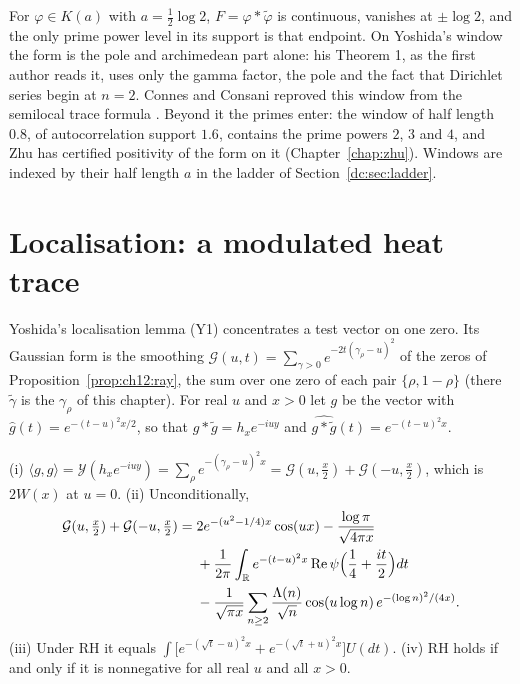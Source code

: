 For $\varphi\in K(a)$ with $a=\frac12\log2$, $F=\varphi*\widetilde\varphi$ is continuous, vanishes at $\pm\log2$, and the only prime power level in its support is that endpoint. On Yoshida's window the form is the pole and archimedean part alone: his Theorem 1, as the first author reads it, uses only the gamma factor, the pole and the fact that Dirichlet series begin at $n=2$. Connes and Consani reproved this window from the semilocal trace formula \cite{ConnesConsani21}. Beyond it the primes enter: the window of half length $0.8$, of autocorrelation support $1.6$, contains the prime powers $2$, $3$ and $4$, and Zhu \cite{Zhu26} has certified positivity of the form on it (Chapter~\ref{chap:zhu}). Windows are indexed by their half length $a$ in the ladder of Section~\ref{dc:sec:ladder}.

\section{Localisation: a modulated heat trace}\label{yo:sec:loc}

Yoshida's localisation lemma (Y1) concentrates a test vector on one zero. Its Gaussian form is the smoothing $\mathcal G(u,t)=\sum_{\gamma>0}e^{-2t(\gamma_\rho-u)^2}$ of the zeros of Proposition~\ref{prop:ch12:ray}, the sum over one zero of each pair $\{\rho,1-\rho\}$ (there $\widetilde\gamma$ is the $\gamma_\rho$ of this chapter). For real $u$ and $x>0$ let $g$ be the vector with $\widehat g(t)=e^{-(t-u)^2x/2}$, so that $g*\widetilde g=h_xe^{-iuy}$ and $\widehat{g*\widetilde g}(t)=e^{-(t-u)^2x}$.

\begin{proposition}\label{yo:prop:W}
(i) $\langle g,g\rangle=\mathcal Y(h_xe^{-iuy})=\sum_\rho e^{-(\gamma_\rho-u)^2x}=\mathcal G(u,\tfrac x2)+\mathcal G(-u,\tfrac x2)$, which is $2W(x)$ at $u=0$. (ii) Unconditionally,
\[
\begin{split}
\mathcal G(u,\tfrac x2)+\mathcal G(-u,\tfrac x2)={}&2e^{-(u^2-1/4)x}\cos(ux)-\frac{\log\pi}{\sqrt{4\pi x}}\\
&+\frac1{2\pi}\int_{\mathbb{R}} e^{-(t-u)^2x}\operatorname{Re}\psi\Bigl(\frac14+\frac{it}2\Bigr)dt\\
&-\frac1{\sqrt{\pi x}}\sum_{n\ge2}\frac{\Lambda(n)}{\sqrt n}\cos(u\log n)\,e^{-(\log n)^2/(4x)} .
\end{split}
\]
(iii) Under RH it equals $\int\bigl[e^{-(\sqrt t-u)^2x}+e^{-(\sqrt t+u)^2x}\bigr]U(dt)$. (iv) RH holds if and only if it is nonnegative for all real $u$ and all $x>0$.
\end{proposition}


